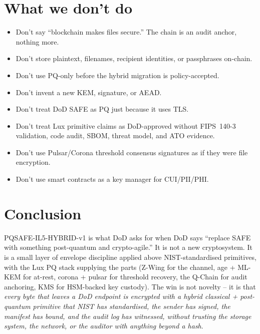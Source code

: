 \documentclass[11pt,a4paper]{article}
\begin{document}
\section{What we don't do}
\label{sec:nondoers}

\begin{itemize}[leftmargin=*,itemsep=0pt]
\item Don't say ``blockchain makes files secure.'' The chain is an
  audit anchor, nothing more.
\item Don't store plaintext, filenames, recipient identities, or
  passphrases on-chain.
\item Don't use PQ-only before the hybrid migration is policy-accepted.
\item Don't invent a new KEM, signature, or AEAD.
\item Don't treat DoD SAFE as PQ just because it uses TLS.
\item Don't treat Lux primitive claims as DoD-approved without
  FIPS~140-3 validation, code audit, SBOM, threat model, and ATO
  evidence.
\item Don't use Pulsar/Corona threshold consensus signatures as if
  they were file encryption.
\item Don't use smart contracts as a key manager for CUI/PII/PHI.
\end{itemize}

\section{Conclusion}

PQSAFE-IL5-HYBRID-v1 is what DoD asks for when DoD says ``replace SAFE
with something post-quantum and crypto-agile.'' It is not a new
cryptosystem. It is a small layer of envelope discipline applied above
NIST-standardised primitives, with the Lux PQ stack supplying the
parts (Z-Wing for the channel, age + ML-KEM for at-rest, corona +
pulsar for threshold recovery, the Q-Chain for audit anchoring, KMS
for HSM-backed key custody). The win is not novelty -- it is that
\emph{every byte that leaves a DoD endpoint is encrypted with a hybrid
classical + post-quantum primitive that NIST has standardised, the
sender has signed, the manifest has bound, and the audit log has
witnessed, without trusting the storage system, the network, or the
auditor with anything beyond a hash}.
\end{document}
